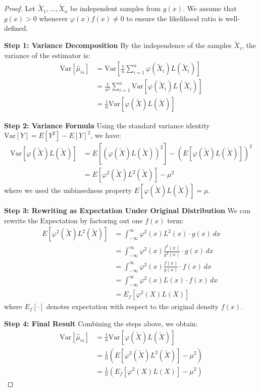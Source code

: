 \begin{proof}
Let $\tilde{X}_1, \ldots, \tilde{X}_n$ be independent samples from $g(x)$. We assume that $g(x) > 0$ whenever $\varphi(x)f(x) \neq 0$ to ensure the likelihood ratio is well-defined.

\textbf{Step 1: Variance Decomposition}
By the independence of the samples $\tilde{X}_i$, the variance of the estimator is:
\begin{align*}
\text{Var}[\hat{\mu}_{is}] &= \text{Var}\left[\frac{1}{n}\sum_{i=1}^n \varphi(\tilde{X}_i)L(\tilde{X}_i)\right]\\
&= \frac{1}{n^2}\sum_{i=1}^n \text{Var}[\varphi(\tilde{X}_i)L(\tilde{X}_i)]\\
&= \frac{1}{n}\text{Var}[\varphi(\tilde{X})L(\tilde{X})]
\end{align*}

\textbf{Step 2: Variance Formula}
Using the standard variance identity $\text{Var}[Y] = E[Y^2] - E[Y]^2$, we have:
\begin{align*}
\text{Var}[\varphi(\tilde{X})L(\tilde{X})] &= E[(\varphi(\tilde{X})L(\tilde{X}))^2] - (E[\varphi(\tilde{X})L(\tilde{X})])^2\\
&= E[\varphi^2(\tilde{X})L^2(\tilde{X})] - \mu^2
\end{align*}
where we used the unbiasedness property $E[\varphi(\tilde{X})L(\tilde{X})] = \mu$.

\textbf{Step 3: Rewriting as Expectation Under Original Distribution}
We can rewrite the Expectation by factoring out one $f(x)$ term:
\begin{align*}
E[\varphi^2(\tilde{X})L^2(\tilde{X})] 
&= \int_{-\infty}^{\infty} \varphi^2(x)L^2(x) \cdot g(x) \, dx \\
&= \int_{-\infty}^{\infty} \varphi^2(x)\frac{f^2(x)}{g^2(x)} \cdot g(x) \, dx\\
&= \int_{-\infty}^{\infty} \varphi^2(x)\frac{f(x)}{g(x)} \cdot f(x) \, dx\\
&= \int_{-\infty}^{\infty} \varphi^2(x)L(x) \cdot f(x) \, dx\\
&= E_f[\varphi^2(X)L(X)]
\end{align*}
where $E_f[\cdot]$ denotes expectation with respect to the original density $f(x)$.

\textbf{Step 4: Final Result}
Combining the steps above, we obtain:
\begin{align*}
\text{Var}[\hat{\mu}_{is}] &= \frac{1}{n}\text{Var}[\varphi(\tilde{X})L(\tilde{X})]\\
&= \frac{1}{n}\left(E[\varphi^2(\tilde{X})L^2(\tilde{X})] - \mu^2\right)\\
&= \frac{1}{n}\left(E_f[\varphi^2(X)L(X)] - \mu^2\right)
\end{align*}
\end{proof}

